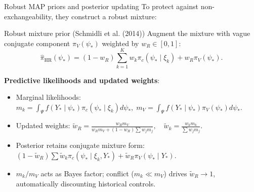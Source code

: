 \documentclass[t]{beamer}
\begin{document}
\begin{frame}{Robust MAP priors and posterior updating}
    \vspace{-0.32cm}
    To protect against non-exchangeability, they construct a robust mixture:

    \begin{block}{Robust mixture prior (Schmidli et al. (2014))}
    Augment the mixture with vague conjugate component $\pi_V(\psi_*)$ weighted by $w_R \in [0,1]$:
    \begin{equation*}
        \hat\pi_{\text{HR}}(\psi_*) = (1 - w_R) \sum_{k=1}^K w_k \pi_c(\psi_* \mid \xi_k) + w_R \pi_V(\psi_*).
    \end{equation*}
    \end{block}

    \textbf{Predictive likelihoods and updated weights}:
    \begin{itemize}
        \setlength{\itemsep}{0.03cm}
        \item Marginal likelihoods: $m_k = \int_\Psi f(Y_* \mid \psi_*) \pi_c(\psi_* \mid \xi_k) d\psi_*, \; m_V = \int_\Psi f(Y_* \mid \psi_*) \pi_V(\psi_*) d\psi_*$.
        \item Updated weights: $\tilde{w}_R = \frac{w_R m_V}{w_R m_V + (1 - w_R)\sum w_j m_j}, \quad \tilde{w}_k = \frac{w_k m_k}{\sum w_j m_j}$.
        \item Posterior retains conjugate mixture form: $(1 - \tilde{w}_R)\sum \tilde{w}_k \pi_c(\psi_* \mid \xi_k, Y_*) + \tilde{w}_R \pi_V(\psi_* \mid Y_*)$.
        \item $m_k/m_V$ acts as Bayes factor; conflict ($m_k \ll m_V$) drives $\tilde{w}_R \to 1$, automatically discounting historical controls.
    \end{itemize}
\end{frame}
\end{document}

